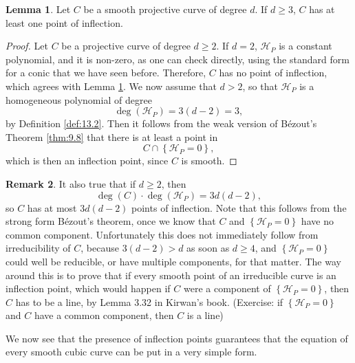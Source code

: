\documentclass{article}
\renewcommand{\H}{\mathcal{H}}
\newcommand{\rb}[1]{\left( #1 \right)}
\newcommand{\cb}[1]{\left\{ #1 \right\}}
\theoremstyle{definition}\newtheorem{definition}{Definition}[section]
\theoremstyle{definition}\newtheorem{notation}[definition]{Notation}
\theoremstyle{definition}\newtheorem{remark}[definition]{Remark}
\theoremstyle{definition}\newtheorem{example1}[definition]{Example}
\theoremstyle{definition}\newtheorem{fact}{Fact}
\theoremstyle{definition}\newtheorem{exercise}{Exercise}
\theoremstyle{definition}\newtheorem*{example2}{Example}
\newtheorem{lemma}[definition]{Lemma}
\begin{document}
\begin{lemma}
\label{lem:13.5}
Let $ C $ be a smooth projective curve of degree $ d $. If $ d \ge 3 $, $ C $ has at least one point of inflection.
\end{lemma}

\begin{proof}
Let $ C $ be a projective curve of degree $ d \ge 2 $. If $ d = 2 $, $ \H_P $ is a constant polynomial, and it is non-zero, as one can check directly, using the standard form for a conic that we have seen before. Therefore, $ C $ has no point of inflection, which agrees with Lemma \ref{lem:13.5}. We now assume that $ d > 2 $, so that $ \H_P $ is a homogeneous polynomial of degree
$$ \deg\rb{\H_P} = 3\rb{d - 2} = 3, $$
by Definition \ref{def:13.2}. Then it follows from the weak version of B\'ezout's Theorem \ref{thm:9.8} that there is at least a point in
$$ C \cap \cb{\H_P = 0}, $$
which is then an inflection point, since $ C $ is smooth.
\end{proof}

\begin{remark}
\label{rem:13.6}
It also true that if $ d \ge 2 $, then
$$ \deg\rb{C} \cdot \deg\rb{\H_P} = 3d\rb{d - 2}, $$
so $ C $ has at most $ 3d\rb{d - 2} $ points of inflection. Note that this follows from the strong form B\'ezout's theorem, once we know that $ C $ and $ \cb{\H_P = 0} $ have no common component. Unfortunately this does not immediately follow from irreducibility of $ C $, because $ 3\rb{d - 2} > d $ as soon as $ d \ge 4 $, and $ \cb{\H_P = 0} $ could well be reducible, or have multiple components, for that matter. The way around this is to prove that if every smooth point of an irreducible curve is an inflection point, which would happen if $ C $ were a component of $ \cb{\H_P = 0} $, then $ C $ has to be a line, by Lemma 3.32 in Kirwan's book. (Exercise: if $ \cb{\H_P = 0} $ and $ C $ have a common component, then $ C $ is a line)
\end{remark}

We now see that the presence of inflection points guarantees that the equation of every smooth cubic curve can be put in a very simple form.
\end{document}
